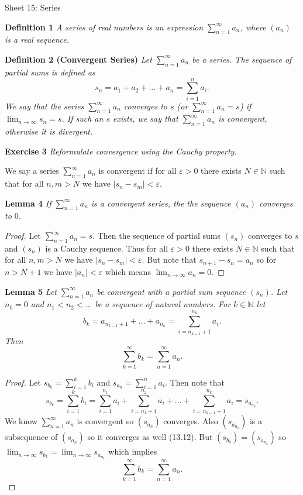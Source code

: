 \documentclass{article}
\begin{document}
\begin{flushleft}

\Large

Sheet 15: Series\newline

\normalsize

\textbf{Definition 1}
\textsl{A series of real numbers is an expression $\sum_{n=1}^{\infty} a_n$, where $(a_n)$ is a real sequence.}\newline

\textbf{Definition 2 (Convergent Series)}
\textsl{Let $\sum_{n=1}^{\infty} a_n$ be a series. The sequence of partial sums is defined as
\[
s_n = a_1 + a_2 + \dots + a_n = \sum_{i=1}^{n} a_i.
\]
We say that the series $\sum_{n=1}^{\infty} a_n$ converges to $s$ (or $\sum_{n=1}^{\infty} a_n = s$) if $\lim_{n \rightarrow \infty} s_n = s$. If such an $s$ exists, we say that $\sum_{n=1}^{\infty} a_n$ is convergent, otherwise it is divergent.}\newline

\textbf{Exercise 3}
\textsl{Reformulate convergence using the Cauchy property.}\newline

We say a series $\sum_{n=1}^{\infty} a_n$ is convergent if for all $\varepsilon > 0$ there exists $N \in \mathbb{N}$ such that for all $n, m > N$ we have $|s_n - s_m| < \varepsilon$.\newline

\textbf{Lemma 4}
\textsl{If $\sum_{n=1}^{\infty} a_n$ is a convergent series, the the sequence $(a_n)$ converges to $0$.}
\begin{proof}
Let $\sum_{n=1}^{\infty} a_n = s$. Then the sequence of partial sums $(s_n)$ converges to $s$ and $(s_n)$ is a Cauchy sequence. Thus for all $\varepsilon > 0$ there exists $N \in \mathbb{N}$ such that for all $n,m > N$ we have $|s_n - s_m| < \varepsilon$. But note that $s_{n+1} - s_n= a_n$ so for $n > N+1$ we have $|a_n| < \varepsilon$ which means $\lim_{n \rightarrow \infty} a_n = 0$.
\end{proof}

\textbf{Lemma 5}
\textsl{Let $\sum_{n=1}^{\infty} a_n$ be convergent with a partial sum sequence $(s_n)$. Let $n_0 = 0$ and $n_1 < n_2 < \dots$ be a sequence of natural numbers. For $k \in \mathbb{N}$ let
\[
b_k = a_{n_{k-1}+1} + \dots + a_{n_k} = \sum_{i = n_{k-1} + 1}^{n_k} a_i.
\]
Then
\[
\sum_{k=1}^{\infty} b_k = \sum_{n=1}^{\infty} a_n.
\]}
\begin{proof}
Let $s_{b_k} = \sum_{i=1}^{k} b_i$ and $s_{a_n} = \sum_{i=1}^{n} a_i$. Then note that
\[
s_{b_k} = \sum_{i=1}^{k} b_i = \sum_{i=1}^{n_1} a_i + \sum_{i = n_{1} + 1}^{n_2} a_i + \dots + \sum_{i = n_{k-1} + 1}^{n_k} a_i = s_{a_{n_k}}.
\]
We know $\sum_{n=1}^{\infty} a_n$ is convergent so $(s_{a_n})$ converges. Also $(s_{a_{n_k}})$ is a subsequence of $(s_{a_n})$ so it converges as well (13.12). But $(s_{b_k}) = (s_{a_{n_k}})$ so $\lim_{n \rightarrow \infty} s_{b_k} = \lim_{n \rightarrow \infty} s_{a_{n_k}}$ which implies
\[
\sum_{k=1}^{\infty} b_k = \sum_{n=1}^{\infty} a_n.
\]
\end{proof}


\end{flushleft}
\end{document}
